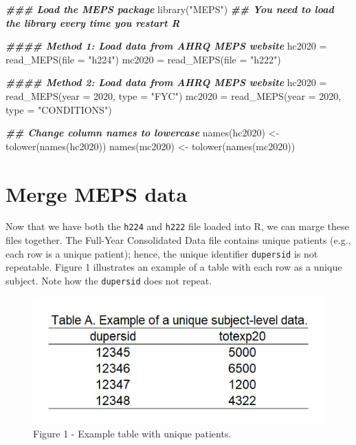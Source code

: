 \documentclass[
]{book}
\newenvironment{Shaded}{\begin{snugshade}}{\end{snugshade}}
\newcommand{\AttributeTok}[1]{\textcolor[rgb]{0.77,0.63,0.00}{#1}}
\newcommand{\DecValTok}[1]{\textcolor[rgb]{0.00,0.00,0.81}{#1}}
\newcommand{\DocumentationTok}[1]{\textcolor[rgb]{0.56,0.35,0.01}{\textbf{\textit{#1}}}}
\newcommand{\FunctionTok}[1]{\textcolor[rgb]{0.00,0.00,0.00}{#1}}
\newcommand{\NormalTok}[1]{#1}
\newcommand{\OtherTok}[1]{\textcolor[rgb]{0.56,0.35,0.01}{#1}}
\newcommand{\StringTok}[1]{\textcolor[rgb]{0.31,0.60,0.02}{#1}}
\theoremstyle{definition}
\theoremstyle{definition}
\theoremstyle{definition}
\theoremstyle{definition}
\theoremstyle{remark}
\begin{document}
\begin{Shaded}
\begin{Highlighting}[]
\DocumentationTok{\#\#\# Load the MEPS package}
\FunctionTok{library}\NormalTok{(}\StringTok{"MEPS"}\NormalTok{) }\DocumentationTok{\#\# You need to load the library every time you restart R}

\DocumentationTok{\#\#\#\# Method 1: Load data from AHRQ MEPS website}
\NormalTok{hc2020 }\OtherTok{=} \FunctionTok{read\_MEPS}\NormalTok{(}\AttributeTok{file =} \StringTok{"h224"}\NormalTok{)}
\NormalTok{mc2020 }\OtherTok{=} \FunctionTok{read\_MEPS}\NormalTok{(}\AttributeTok{file =} \StringTok{"h222"}\NormalTok{)}

\DocumentationTok{\#\#\#\# Method 2: Load data from AHRQ MEPS website}
\NormalTok{hc2020 }\OtherTok{=} \FunctionTok{read\_MEPS}\NormalTok{(}\AttributeTok{year =} \DecValTok{2020}\NormalTok{, }\AttributeTok{type =} \StringTok{"FYC"}\NormalTok{)}
\NormalTok{mc2020 }\OtherTok{=} \FunctionTok{read\_MEPS}\NormalTok{(}\AttributeTok{year =} \DecValTok{2020}\NormalTok{, }\AttributeTok{type =} \StringTok{"CONDITIONS"}\NormalTok{)}

\DocumentationTok{\#\# Change column names to lowercase}
\FunctionTok{names}\NormalTok{(hc2020) }\OtherTok{\textless{}{-}} \FunctionTok{tolower}\NormalTok{(}\FunctionTok{names}\NormalTok{(hc2020))}
\FunctionTok{names}\NormalTok{(mc2020) }\OtherTok{\textless{}{-}} \FunctionTok{tolower}\NormalTok{(}\FunctionTok{names}\NormalTok{(mc2020))}
\end{Highlighting}
\end{Shaded}

\hypertarget{merge-meps-data}{%
\section{Merge MEPS data}\label{merge-meps-data}}

Now that we have both the \texttt{h224} and \texttt{h222} file loaded into R, we can marge these files together. The Full-Year Consolidated Data file contains unique patients (e.g., each row is a unique patient); hence, the unique identifier \texttt{dupersid} is not repeatable. Figure 1 illustrates an example of a table with each row as a unique subject. Note how the \texttt{dupersid} does not repeat.

\begin{figure}
\includegraphics[width=0.8\linewidth]{Figure 2_1} \caption{Figure 1 - Example table with unique patients.}\label{fig:unnamed-chunk-9}
\end{figure}
\end{document}
